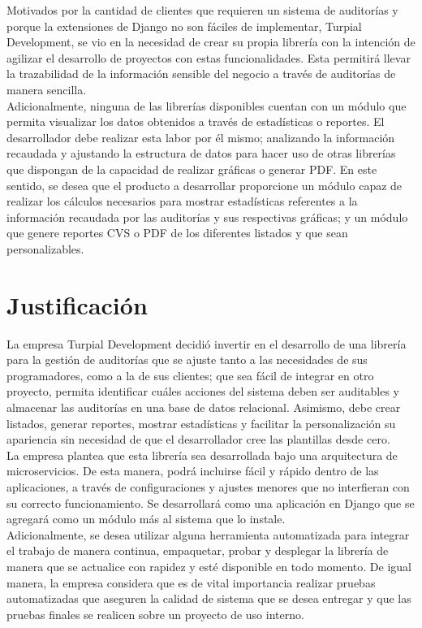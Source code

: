Motivados por la cantidad de clientes que requieren un sistema de auditorías y
porque la extensiones de Django no son fáciles de implementar, Turpial
Development, se vio en la necesidad de crear su propia librería con la intención de agilizar
el desarrollo de proyectos con estas funcionalidades. Esta permitirá
llevar la trazabilidad de la información sensible del negocio a través de
auditorías de manera sencilla.\\

Adicionalmente, ninguna de las librerías disponibles cuentan con un módulo que
permita visualizar los datos obtenidos a través de estadísticas o reportes. El
desarrollador debe realizar esta labor por él mismo; analizando la información
recaudada y ajustando la estructura de datos para hacer uso de otras librerías
que dispongan de la capacidad de realizar gráficas o generar PDF. En este
sentido, se desea que el producto a desarrollar proporcione un módulo capaz de
realizar los cálculos necesarios para mostrar estadísticas referentes a la
información recaudada por las auditorías y sus respectivas gráficas; y un
módulo que genere reportes CVS o PDF de los diferentes listados y que sean
personalizables.

\section{Justificación}

La empresa Turpial Development decidió invertir en el desarrollo de una
librería para la gestión de auditorías que se ajuste tanto a las necesidades de
sus programadores, como a la de sus clientes; que sea fácil de integrar en otro proyecto,
permita identificar cuáles acciones del sistema deben ser
auditables y almacenar las auditorías en una base de datos relacional. Asimismo, debe
crear listados, generar reportes, mostrar estadísticas y facilitar la personalización su apariencia sin necesidad de que el
desarrollador cree las plantillas desde cero.\\

La empresa plantea que esta librería sea desarrollada bajo una arquitectura de
microservicios. De esta manera, podrá incluirse fácil y rápido dentro de las aplicaciones, a través de
configuraciones y ajustes menores que no interfieran con su correcto
funcionamiento. Se desarrollará como una aplicación en Django que se agregará
como un módulo más al sistema que lo instale.\\

Adicionalmente, se desea utilizar alguna herramienta automatizada para integrar
el trabajo de manera continua, empaquetar, probar y desplegar la librería de
manera que se actualice con rapidez y esté disponible en todo momento.
De igual manera, la empresa considera que es de vital importancia realizar pruebas
automatizadas que aseguren la calidad de sistema que se desea entregar y que
las pruebas finales se realicen sobre un proyecto de uso interno.

